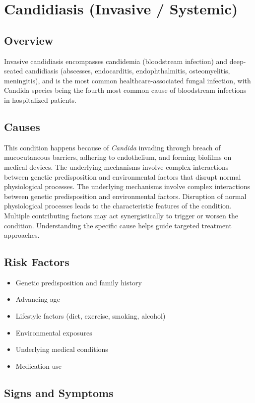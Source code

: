 \chapter{Candidiasis (Invasive / Systemic)}
\label{sec:Candidiasis Systemic}

\section{Overview}
Invasive candidiasis encompasses candidemia (bloodstream infection) and deep-seated candidiasis (abscesses, endocarditis, endophthalmitis, osteomyelitis, meningitis), and is the most common healthcare-associated fungal infection, with Candida species being the fourth most common cause of bloodstream infections in hospitalized patients.
\section{Causes}
This condition happens because of \textit{Candida} invading through breach of mucocutaneous barriers, adhering to endothelium, and forming biofilms on medical devices. The underlying mechanisms involve complex interactions between genetic predisposition and environmental factors that disrupt normal physiological processes. The underlying mechanisms involve complex interactions between genetic predisposition and environmental factors. Disruption of normal physiological processes leads to the characteristic features of the condition. Multiple contributing factors may act synergistically to trigger or worsen the condition. Understanding the specific cause helps guide targeted treatment approaches.
\section{Risk Factors}


\begin{itemize}[noitemsep]
  \item Genetic predisposition and family history
  \item Advancing age
  \item Lifestyle factors (diet, exercise, smoking, alcohol)
  \item Environmental exposures
  \item Underlying medical conditions
  \item Medication use
\end{itemize}
\section{Signs and Symptoms}

